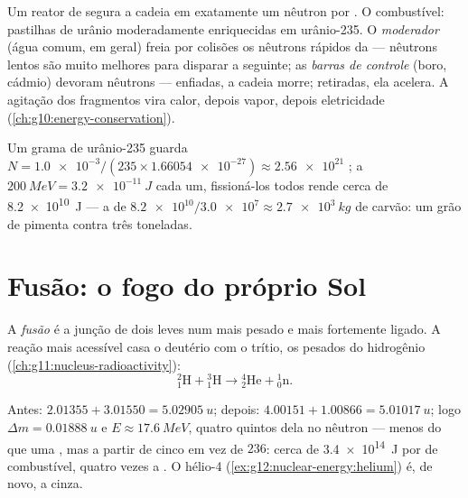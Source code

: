 \begin{definition}\label{def:g12:nuclear-energy:reactor}
Um reator de  segura a cadeia em exatamente um nêutron por . O
combustível: pastilhas de urânio moderadamente enriquecidas em urânio-235. O
\emph{moderador} (água comum, em geral) freia por colisões os nêutrons
rápidos da  --- nêutrons lentos são muito melhores para disparar a 
seguinte; as \emph{barras de controle} (boro, cádmio) devoram
nêutrons --- enfiadas, a cadeia morre; retiradas, ela acelera. A agitação dos fragmentos
vira calor, depois vapor, depois eletricidade (\cref{ch:g10:energy-conservation}).
\end{definition}

\begin{example}\label{ex:g12:nuclear-energy:gram}
Um grama de urânio-235 guarda
$N = \num{1.0e-3} / (235 \times \num{1.66054e-27}) \approx \num{2.56e21}$ ; a
$\qty{200}{MeV} = \qty{3.2e-11}{J}$ cada um, fissioná-los todos rende cerca de
\qty{8.2e10}{J} --- a  de
$\num{8.2e10} / \num{3.0e7} \approx \qty{2.7e3}{kg}$ de carvão: um grão de pimenta
contra três toneladas.
\end{example}

\section{Fusão: o fogo do próprio Sol}

\begin{definition}[Fusão]\label{def:g12:nuclear-energy:fusion}
A \emph{fusão} é a junção de dois  leves num  mais pesado e
mais fortemente ligado. A reação mais acessível casa o deutério com o trítio, os
 pesados do hidrogênio (\cref{ch:g11:nucleus-radioactivity}):
\[
{}^{2}_{1}\mathrm{H} + {}^{3}_{1}\mathrm{H} \longrightarrow
{}^{4}_{2}\mathrm{He} + {}^{1}_{0}\mathrm{n}.
\]
\end{definition}

\begin{example}[D--T, pesada]\label{ex:g12:nuclear-energy:dt}
Antes: $2.01355 + 3.01550 = \qty{5.02905}{u}$; depois:
$4.00151 + 1.00866 = \qty{5.01017}{u}$; logo $\Delta m = \qty{0.01888}{u}$ e
$E \approx \qty{17.6}{MeV}$, quatro quintos dela no nêutron --- menos do que uma ,
mas a partir de cinco  em vez de $236$: cerca de \qty{3.4e14}{J} por 
de combustível, quatro vezes a . O hélio-4
(\cref{ex:g12:nuclear-energy:helium}) é, de novo, a cinza.
\end{example}

